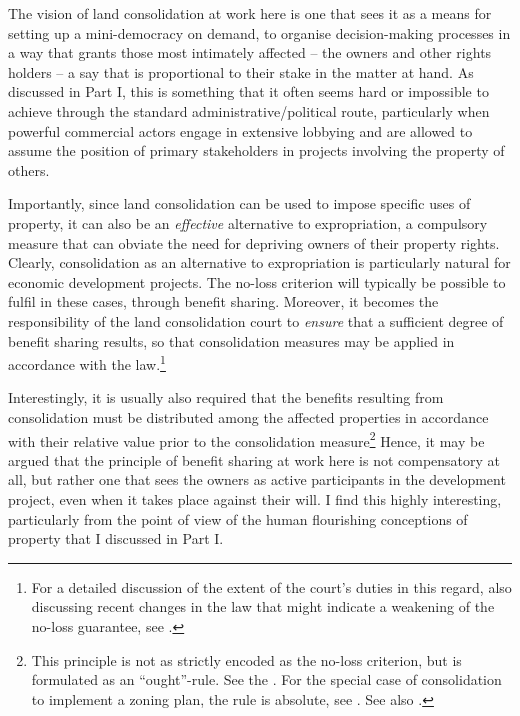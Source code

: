 The vision of land consolidation at work here is one that sees it as a means for setting up a mini-democracy on demand, to organise decision-making processes in a way that grants those most intimately affected -- the owners and other rights holders -- a say that is proportional to their stake in the matter at hand. As discussed in Part I, this is something that it often seems hard or impossible to achieve through the standard administrative/political route, particularly when powerful commercial actors engage in extensive lobbying and are allowed to assume the position of primary stakeholders in projects involving the property of others.

Importantly, since land consolidation can be used to impose specific uses of property, it can also be an {\it effective} alternative to expropriation, a compulsory measure that can obviate the need for depriving owners of their property rights. Clearly, consolidation as an alternative to expropriation is particularly natural for economic development projects. The no-loss criterion will typically be possible to fulfil in these cases, through benefit sharing. Moreover, it becomes the responsibility of the land consolidation court to {\it ensure} that a sufficient degree of benefit sharing results, so that consolidation measures may be applied in accordance with the law.\footnote{For a detailed discussion of the extent of the court's duties in this regard, also discussing recent changes in the law that might indicate a weakening of the no-loss guarantee, see \cite{hauge15}.}

Interestingly, it is usually also required that the benefits resulting from consolidation must be distributed among the affected properties in accordance with their relative value prior to the consolidation measure\footnote{This principle is not as strictly encoded as the no-loss criterion, but is formulated as an ``ought''-rule. See the \cite[31|41]{lca79}. For the special case of consolidation to implement a zoning plan, the rule is absolute, see \cite[3 b)]{lca79}. See also \cite{hauge15}.} Hence, it may be argued that the principle of benefit sharing at work here is not compensatory at all, but rather one that sees the owners as active participants in the development project, even when it takes place against their will. I find this highly interesting, particularly from the point of view of the human flourishing conceptions of property that I discussed in Part I.

